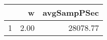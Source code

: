 \begin{table}[h]
\centering
\begingroup\tiny
\begin{tabular}{rrr}
  \hline
 & w & avgSampPSec \\ 
  \hline
1 & 2.00 & 28078.77 \\ 
   \hline
\end{tabular}
\endgroup
\end{table}
